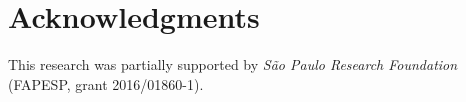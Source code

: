 \documentclass[preprint,authoryear]{elsarticle}
\begin{document}
\section*{Acknowledgments}

This research was partially supported by \textit{São Paulo Research Foundation} (FAPESP, grant 2016/01860-1).




\end{document}

